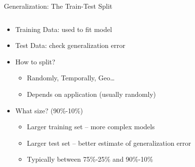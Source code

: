 \documentclass[aspectratio=169]{../latex_main/tntbeamer}  %
\begin{document}
	
	\begin{frame}{Generalization: The Train-Test Split}
	    \begin{columns}
	        \begin{column}{.5\textwidth}
	               \begin{itemize}
	                   \item Training Data: used to fit model
	                   \item Test Data: check generalization error
	                   \item How to split? 
	                   \begin{itemize}
	                       \item Randomly, Temporally, Geo…
	                       \item Depends on application (usually randomly)
	                   \end{itemize}
	                   \item What size? (90\%-10\%)
	                   \begin{itemize}
	                       \item Larger training set – more complex models
	                       \item Larger test set – better estimate of generalization error 
	                       \item Typically between 75\%-25\% and 90\%-10\%
	                   \end{itemize}
	               \end{itemize} 
	        \end{column}
	        

\end{columns}
\end{frame}
\end{document}
